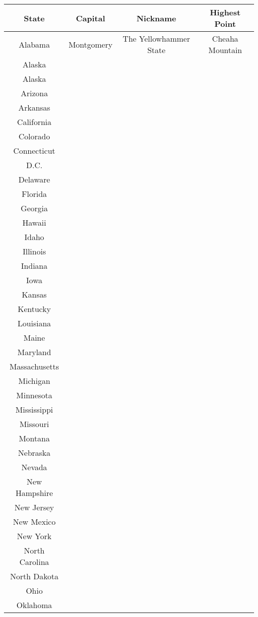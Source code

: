 			\begin{tabular}{|c|c|c|c|}
				\hline
				\textbf{State} & \textbf{Capital} & \textbf{Nickname} & \textbf{Highest Point} \\
				\hline
				Alabama & Montgomery & The Yellowhammer State & Cheaha Mountain  \\
				\hline
				 Alaska & & & \\
				 \hline
				 Alaska 	& & &  \\
				 \hline
				 Arizona 	& & &  \\
				 \hline
				 Arkansas 	& & &  \\
				 \hline
				 California 	& & &  \\
				 \hline
				 Colorado 	& & &  \\
				 \hline
				 Connecticut 	& & &  \\
				 \hline
				 D.C. 	& & &  \\
				 \hline
				 Delaware 	& & &  \\
				 \hline
				 Florida 	& & &  \\
				 \hline
				 Georgia 	& & &  \\
				 \hline
				 Hawaii 	& & &  \\
				 \hline
				 Idaho 	& & &  \\
				 \hline
				 Illinois 	& & &  \\
				 \hline
				 Indiana 	& & &  \\
				 \hline
				 Iowa 	& & &  \\
				 \hline
				 Kansas 	& & &  \\
				 \hline
				 Kentucky 	& & &  \\
				 \hline
				 Louisiana 	& & &  \\
				 \hline
				 Maine 	& & &  \\
				 \hline
				 Maryland 	& & &  \\
				 \hline
				 Massachusetts 	& & &  \\
				 \hline
				 Michigan 	& & &  \\
				 \hline
				 Minnesota 	& & &  \\
				 \hline
				 Mississippi 	& & &  \\
				 \hline
				 Missouri 	& & &  \\
				 \hline
				 Montana 	& & &  \\
				 \hline
				 Nebraska 	& & &  \\
				 \hline
				 Nevada 	& & &  \\
				 \hline
				 New Hampshire 	& & &  \\
				 \hline
				 New Jersey 	& & &  \\
				 \hline
			
				 New Mexico 	& & &  \\
				 \hline
				 New York 	& & &  \\
				 \hline
				 North Carolina 	& & &  \\
				 \hline
				 North Dakota 	& & &  \\
				 \hline
				 Ohio 	& & &  \\
				 \hline
				 Oklahoma 	& & &  \\
				 \hline
				 	\end{tabular}
			 

